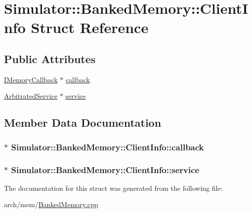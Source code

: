 \hypertarget{struct_simulator_1_1_banked_memory_1_1_client_info}{\section{Simulator\+:\+:Banked\+Memory\+:\+:Client\+Info Struct Reference}
\label{struct_simulator_1_1_banked_memory_1_1_client_info}
}
\subsection*{Public Attributes}
\begin{DoxyCompactItemize}
\item 
\hyperlink{class_simulator_1_1_i_memory_callback}{I\+Memory\+Callback} $\ast$ \hyperlink{struct_simulator_1_1_banked_memory_1_1_client_info_a19b41bd5f2c09e936dd0e719748446cb}{callback}
\item 
\hyperlink{class_simulator_1_1_arbitrated_service}{Arbitrated\+Service} $\ast$ \hyperlink{struct_simulator_1_1_banked_memory_1_1_client_info_ac2ea447a84757fde5a8033198047434b}{service}
\end{DoxyCompactItemize}


\subsection{Member Data Documentation}
\hypertarget{struct_simulator_1_1_banked_memory_1_1_client_info_a19b41bd5f2c09e936dd0e719748446cb}{
\subsubsection[{callback}]{$\ast$ Simulator\+::\+Banked\+Memory\+::\+Client\+Info\+::callback}}\label{struct_simulator_1_1_banked_memory_1_1_client_info_a19b41bd5f2c09e936dd0e719748446cb}
\hypertarget{struct_simulator_1_1_banked_memory_1_1_client_info_ac2ea447a84757fde5a8033198047434b}{
\subsubsection[{service}]{$\ast$ Simulator\+::\+Banked\+Memory\+::\+Client\+Info\+::service}}\label{struct_simulator_1_1_banked_memory_1_1_client_info_ac2ea447a84757fde5a8033198047434b}


The documentation for this struct was generated from the following file\+:\begin{DoxyCompactItemize}
\item 
arch/mem/\hyperlink{_banked_memory_8cpp}{Banked\+Memory.\+cpp}\end{DoxyCompactItemize}
